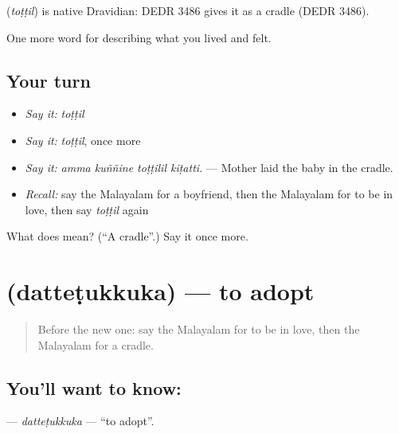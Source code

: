 \begin{cousinweb}
\textbf{} (\emph{toṭṭil}) is native Dravidian: DEDR 3486 gives it as a cradle (DEDR 3486).
\end{cousinweb}

\begin{grammarlens}[title={What you've built}]
One more word for describing what you lived and felt.
\end{grammarlens}

\subsection*{Your turn}
\begin{itemize}
\raggedright
  \item \emph{Say it:} \emph{toṭṭil}
  \item \emph{Say it:} \emph{toṭṭil}, once more
  \item \emph{Say it:} \emph{amma kuññine toṭṭilil kiṭatti.} — Mother laid the baby in the cradle.
  \item \emph{Recall:} say the Malayalam for a boyfriend, then the Malayalam for to be in love, then say \emph{toṭṭil} again
\end{itemize}

\begin{tcolorbox}[breakable,colback=teal!4,colframe=teal!35!black,title={Before you move on}]
What does  mean? (\textquotedblleft{}A cradle\textquotedblright{}.) Say it once more.
\end{tcolorbox}
\section[\texorpdfstring{\ml{ദത്തെടുക്കുക} (datteṭukkuka)}{ദത്തെടുക്കുക (datteṭukkuka)}]{ (datteṭukkuka) — to adopt}

\label{lesson:ML-C553-dattetukkuka}



\begin{quote}
Before the new one: say the Malayalam for to be in love, then the Malayalam for a cradle.
\end{quote}

\subsection*{You'll want to know: }
\textbf{} — \emph{datteṭukkuka} — \textquotedblleft{}to adopt\textquotedblright{}.

